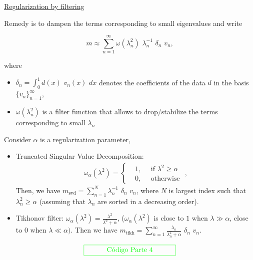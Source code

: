 \documentclass{beamer}
\begin{document}
\begin{frame}
{\color{red} \underline{Regularization by filtering}}

Remedy is to dampen the terms corresponding to small eigenvalues and write

$$m \approx \sum_{n=1}^{\infty} \omega(\lambda_n^2) \,\, \lambda_n^{-1} \,\, \delta_n \,\, v_n,$$

where

\begin{itemize}
\item $\delta_n=\int_0^1 d(x)\,\, v_n(x) \,\, dx$  denotes the coefficients of the data $d$  in the basis $ \{ v_n \}_{n=1}^{\infty}$,
\item $\omega(\lambda_n^2)$ is a filter function that allows to drop/stabilize the terms corresponding to small $\lambda_n$
\end{itemize}
\end{frame}

\begin{frame}
Consider $\alpha$ is a regularization parameter,
\begin{itemize}
\item {\color{red} Truncated Singular Value Decomposition:} \begin{eqnarray*}
\omega_{\alpha}(\lambda^2) = \left\{
\begin{aligned}
&1, \quad  \mbox{ if } \lambda^2 \geq \alpha \\
&0, \quad \mbox{ otherwise }
\end{aligned},
\right.
\end{eqnarray*} Then, we have $m_{\mbox{svd}}=\sum_{n=1}^{N} \lambda_n^{-1} \,\, \delta_n \,\, v_n$, where $N$ is largest index such that $\lambda_n^2 \geq \alpha$ (assuming that $\lambda_n$ are sorted in a decreasing order). 
\item {\color{red} Tikhonov filter:} $\omega_{\alpha}(\lambda^2)=\frac{\lambda^2}{\lambda^2 + \alpha}$, ($\omega_{\alpha}(\lambda^2)$ is close to $1$ when $\lambda \gg \alpha$, close to $0$ when $\lambda \ll \alpha)$.
Then we have $m_{\mbox{tikh}} = \sum_{n=1}^{\infty} \frac{\lambda_n}{\lambda_n^2 + \alpha} \,\, \delta_n \,\, v_n$.
\end{itemize}

$${\color{green} \framebox[2\width]{C\'odigo Parte 4}}$$
\end{frame}
\end{document}
